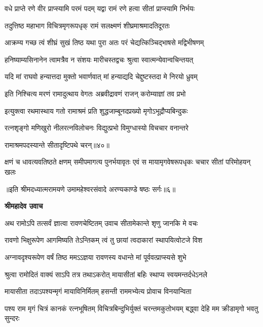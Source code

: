 \twolineshloka
{वधे प्राप्ते रणे वीर प्राप्स्यामि परमं पदम्}
{यद्वा रामं रणे हत्वा सीतां प्राप्स्यामि निर्भयः} %

\twolineshloka
{तदुत्तिष्ठ महाभाग विचित्रमृगरूपधृक्}
{रामं सलक्ष्मणं शीघ्रमाश्रमादतिदूरतः} %

\twolineshloka
{आक्रम्य गच्छ त्वं शीघ्रं सुखं तिष्ठ यथा पुरा}
{अतः परं चेद्यत्किञ्चिद्भाषसे मद्विभीषणम्} %

\twolineshloka
{हनिष्याम्यसिनानेन त्वामत्रैव न संशयः}
{मारीचस्तद्वचः श्रुत्वा स्वात्मन्येवान्वचिन्तयत्} %

\twolineshloka
{यदि मां राघवो हन्यात्तदा मुक्तो भवार्णवात्}
{मां हन्याद्यदि चेद्दुष्टस्तदा मे निरयो ध्रुवम्} %

\twolineshloka
{इति निश्चित्य मरणं रामादुत्थाय वेगतः}
{अब्रवीद्रावणं राजन् करोम्याज्ञां तव प्रभो} %

\twolineshloka
{इत्युक्त्वा रथमास्थाय गतो रामाश्रमं प्रति}
{शुद्धजाम्बूनदप्रख्यो मृगोऽभूद्रौप्यबिन्दुकः} %

\twolineshloka
{रत्नशृङ्गो मणिखुरो नीलरत्नविलोचनः}
{विद्युत्प्रभो विमुग्धास्यो विचचार वनान्तरे} %

{रामाश्रमपदस्यान्ते सीतादृष्टिपथे चरन्॥४०॥} %


\fourlineindentedshloka
{क्षणं च धावत्यवतिष्ठते क्षणम्}
{समीपमागत्य पुनर्भयावृतः}
{एवं स मायामृगवेषरूपधृकः}
{चचार सीतां परिमोहयन् खलः} %

{॥इति श्रीमदध्यात्मरामयणे उमामहेश्वरसंवादे
अरण्यकाण्डे षष्ठः सर्गः॥६॥
}




\textbf{श्रीमहादेव उवाच}

\twolineshloka
{अथ रामोऽपि तत्सर्वं ज्ञात्वा रावणचेष्टितम्}
{उवाच सीतामेकान्ते शृणु जानकि मे वचः} %

\twolineshloka
{रावणो भिक्षुरूपेण आगमिष्यति तेऽन्तिकम्}
{त्वं तु छायां त्वदाकारां स्थापयित्वोटजे विश} %

\twolineshloka
{अग्नावदृश्यरूपेण वर्षं तिष्ठ ममऽऽज्ञया}
{रावणस्य वधान्ते मां पूर्ववत्प्राप्स्यसे शुभे} %

\twolineshloka
{श्रुत्वा रामोदितं वाक्यं साऽपि तत्र तथाऽकरोत्}
{मायासीतां बहिः स्थाप्य स्वयमन्तर्दधेऽनले} %

\twolineshloka
{मायासीता तदाऽपश्यन्मृगं मायाविनिर्मितम्}
{हसन्ती राममभ्येत्य प्रोवाच विनयान्विता} %

\threelineshloka
{पश्य राम मृगं चित्रं कानकं रत्नभूषितम्}
{विचित्रबिन्दुभिर्युक्तं चरन्तमकुतोभयम्}
{बद्ध्वा देहि मम क्रीडामृगो भवतु सुन्दरः} %

